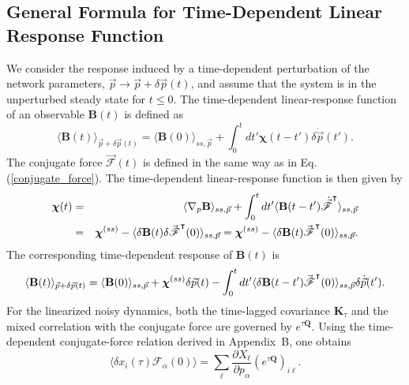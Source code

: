 \subsection{General Formula for Time-Dependent Linear Response Function}
\quad We consider the response induced by a time-dependent perturbation of the network parameters, $\vec{p}\rightarrow\vec{p}+\delta \vec{p}(t)$, and assume that the system is in the unperturbed steady state for $t\le 0$. The time-dependent linear-response function of an observable $\mathbf{B}(t)$ is defined as
\begin{equation}
    \langle \mathbf{B}(t) \rangle_{\vec{p}+\delta \vec{p}(t)} = \langle \mathbf{B}(0) \rangle_{ss,\vec{p}} + \int_0^t dt' \boldsymbol{\chi}(t-t') \delta \dot{\vec{p}}(t').
    \label{time-dependent_response}
\end{equation}
The conjugate force $\vec{\mathscr{F}}(t)$ is defined in the same way as in Eq. (\ref{conjugate_force}). The time-dependent linear-response function is then given by
\begin{eqnarray}
    \boldsymbol{\chi}(t) &=&\langle \nabla_p{\mathbf{B}} \rangle_{ss,{\vec p}} + \int_0^t dt'\langle {\mathbf {B}}(t-t'){\dot{\vec{\mkern0mu\mathscr F}}}^\intercal\rangle_{ss,{\vec p}} \nonumber\\
    &=& \boldsymbol{\chi} ^{(ss)}- \langle \delta{\mathbf B}(t)\delta{\vec{\mkern0mu\mathscr F}}^\intercal(0)\rangle_{ss,{\vec p}}=\boldsymbol{\chi} ^{(ss)}- \langle \delta{\mathbf B}(t){\vec{\mkern0mu\mathscr F}}^\intercal(0)\rangle_{ss,{\vec p}}.
    \label{chineqm}
\end{eqnarray}
The corresponding time-dependent response of $\mathbf{B}(t)$ is
\begin{equation}
    \langle \mathbf{B}(t)\rangle_{{\vec p}+\delta{\vec p}(t)}= \langle \mathbf{ B}(0)\rangle_{ss,{\vec p}}+\boldsymbol{\chi}^{(ss)}\delta {\vec p}(t)-\int_0^t dt'\langle \delta\mathbf{ B}(t-t'){\vec{\mkern0mu\mathscr F}}^\intercal(0)\rangle_{ss,{\vec p}} \delta{\dot {\vec p}}(t').
    \label{Bnoneqm}
\end{equation}
For the linearized noisy dynamics, both the time-lagged covariance $\mathbf{K}_\tau$ and the mixed correlation with the conjugate force are governed by $e^{\tau \mathbf{Q}}$. Using the time-dependent conjugate-force relation derived in Appendix~B, one obtains
\begin{equation}
    \langle \delta x_i(\tau)\mathscr{F}_\alpha(0)\rangle = \sum_\ell \frac{\partial X_\ell}{\partial p_\alpha}
    (e^{\tau \mathbf{Q}})_{i\ell}.
    \label{time_mixed_xF}
\end{equation}

